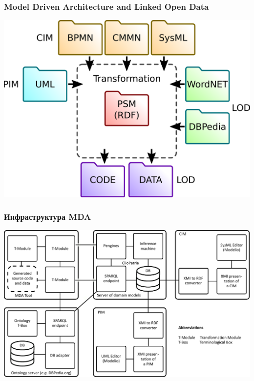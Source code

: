 \documentclass[handout]{beamer}
\begin{document}
\begin{frame}
  \frametitle{Model Driven Architecture and Linked Open Data}
  \begin{center}
    \includegraphics[width=0.9\linewidth]{mda-overview.pdf}
  \end{center}
\end{frame}

\begin{frame}
  \frametitle{Инфраструктура MDA}
  \centering
  \includegraphics[width=1\linewidth]{architecture-mda-lod-ext.pdf}
\end{frame}
\end{document}
